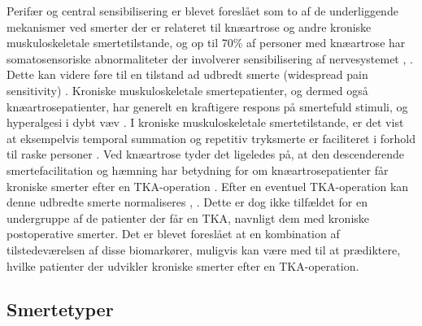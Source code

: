 Perifær og central sensibilisering er blevet foreslået som to af de underliggende mekanismer ved smerter der er relateret til knæartrose og andre kroniske muskuloskeletale smertetilstande, og op til 70\% af personer med knæartrose har somatosensoriske abnormaliteter der involverer sensibilisering af nervesystemet  \citep{Arendt-Nielsen2010}, \citep{lars}. Dette kan videre føre til en tilstand ad udbredt smerte (widespread pain sensitivity)  \citep{Petersen2016}. Kroniske muskuloskeletale smertepatienter, og dermed også knæartrosepatienter, har generelt en kraftigere respons på smertefuld stimuli, og hyperalgesi i dybt væv \citep{Arendt-Nielsen2010}. I kroniske muskuloskeletale smertetilstande, er det vist at eksempelvis temporal summation og repetitiv tryksmerte er faciliteret i forhold til raske personer \citep{widespread}. Ved knæartrose tyder det ligeledes på, at den descenderende smertefacilitation og hæmning har betydning for om knæartrosepatienter får kroniske smerter efter en TKA-operation \citep{Petersen2016}. Efter en eventuel TKA-operation kan denne udbredte smerte normaliseres \citep{Petersen2016}, \citep{graven2012}. Dette er dog ikke tilfældet for en undergruppe af de patienter der får en TKA, navnligt dem med kroniske postoperative smerter.
Det er blevet foreslået at en kombination af tilstedeværelsen af disse biomarkører, muligvis kan være med til at prædiktere, hvilke patienter der udvikler kroniske smerter efter en TKA-operation. \citep{Petersen2016}


\subsection{Smertetyper}



